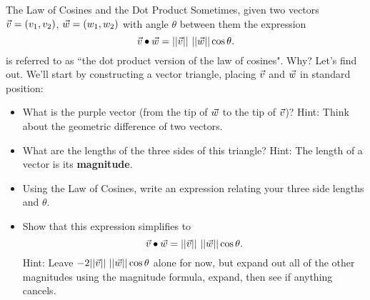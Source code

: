 
\begin{exercise}{The Law of Cosines and the Dot Product}
Sometimes, given two vectors $\vec{v}=(v_1,v_2)$, $\vec{w}=(w_1,w_2)$ with angle $\theta$ between them the expression $$\vcv\bullet\vcw=||\vcv|| \ ||\vcw||\cos\theta. $$ is referred to as ``the dot product version of the law of cosines". Why? Let's find out. We'll start by constructing a vector triangle, placing $\vec{v}$ and $\vec{w}$ in standard position:
\begin{center}
\end{center}
	\begin{itemize}
	\item What is the purple vector (from the tip of $\vec{w}$ to the tip of $\vec{v}$)? Hint: Think about the geometric difference of two vectors.
	\vspace{5em}
	\item What are the lengths of the three sides of this triangle? Hint: The length of a vector is its \textbf{magnitude}.
	\vspace{5em}
	\item Using the Law of Cosines, write an expression relating your three side lengths and $\theta$.
	\vspace{10em}
	\item Show that this expression simplifies to $$\vcv\bullet\vcw=||\vcv|| \ ||\vcw||\cos\theta. $$
	Hint: Leave $-2||\vec{v}|| \ ||\vec{w}||\cos\theta$ alone for now, but expand out all of the other magnitudes using the magnitude formula, expand, then see if anything cancels.
	\vspace{50em}
	\end{itemize}
\end{exercise}

